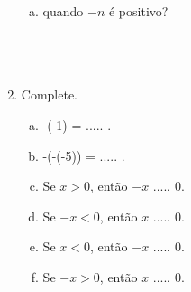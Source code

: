 \documentclass[a4paper,14pt]{article}
\begin{document}
\begin{multicols}{2}
\begin{enumerate}
\begin{enumerate}[a)]
				\item quando $-n$ é positivo? \\\\\\\\
			\end{enumerate}
			\item Complete.
			\begin{enumerate}[a)] 
				\item -(-1) = ..... .
				\item -(-(-5)) = ..... .
				\item Se $x > 0$, então $-x$ ..... 0.
				\item Se $-x < 0$, então $x$ ..... 0.
				\item Se $x < 0$, então $-x$ ..... 0.
				\item Se $-x > 0$, então $x$ ..... 0.
			\end{enumerate}
		\end{enumerate}
		$~$ \\ $~$ \\ $~$ \\ $~$ \\ $~$ \\ $~$ \\ $~$ \\ $~$ \\ $~$ \\
	\end{multicols}
\end{document}
